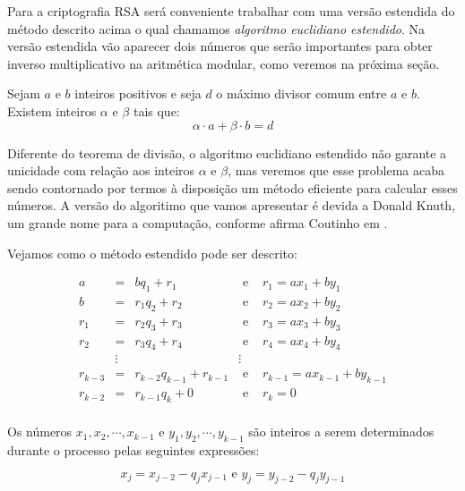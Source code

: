 Para a criptografia RSA ser\'{a} conveniente trabalhar com uma vers\~ao estendida do m\'etodo descrito acima o qual 
chamamos \textit{algoritmo euclidiano estendido}.
Na vers\~{a}o estendida v\~{a}o aparecer dois n\'{u}meros que ser\~{a}o importantes para obter inverso multiplicativo 
na aritm\'{e}tica modular, como veremos na pr\'{o}xima se\c{c}\~{a}o.


\begin{Th}\label{alg.eucl.est.}
Sejam $a$ e $b$ inteiros positivos e seja $d$ o m\'aximo divisor comum entre $a$ e $b$. Existem
inteiros $\alpha$ e $\beta$ tais que:
	$$\alpha\cdot a+\beta\cdot b=d$$
\end{Th}


Diferente do teorema de divis\~ao, o algoritmo euclidiano estendido n\~ao garante a unicidade 
com rela\c{c}\~ao aos inteiros $\alpha$ e $\beta$, mas veremos que esse problema acaba sendo 
contornado por termos \`{a} disposi\c{c}\~ao um m\'etodo eficiente para calcular esses n\'umeros.
A vers\~{a}o do algoritimo que vamos apresentar \'{e} devida a Donald Knuth, um grande nome 
para a computa\c{c}\~{a}o, conforme afirma Coutinho em \cite{cou:2014}.

Vejamos como o m\'{e}todo estendido pode ser descrito:

\[
\begin{array}{rclcl}
a   		& =      & bq_{1}+r_{1} 			    & \textrm{ e } & r_{1}=ax_{1}+by_{1}       \\
b   		& =      & r_{1}q_{2}+r_{2} 	    & \textrm{ e } & r_{2}=ax_{2}+by_{2}     \\
r_{1}		& =      & r_{2}q_{3}+r_{3} 	    & \textrm{ e } & r_{3}=ax_{3}+by_{3}     \\
r_{2}   & =      & r_{3}q_{4}+r_{4} 	    & \textrm{ e } & r_{4}=ax_{4}+by_{4}     \\
        & \vdots &     		          	    &  \vdots      &                     \\
r_{k-3} & =      & r_{k-2}q_{k-1}+r_{k-1} & \textrm{ e } & r_{k-1}=ax_{k-1}+by_{k-1} \\				
r_{k-2} & =      & r_{k-1}q_{k}+ 0        & \textrm{ e } & r_{k}=0 \\		
\end{array}
\]

Os n\'{u}meros $x_{1}, x_{2}, \cdots, x_{k-1}$ e $y_{1}, y_{2}, \cdots, y_{k-1}$ s\~{a}o inteiros a
serem determinados durante o processo pelas seguintes express\~{o}es:

$$x_{j}=x_{j-2}-q_{j}x_{j-1}\textrm{ \ \ e \ \ }  y_{j}=y_{j-2}-q_{j}y_{j-1}$$

